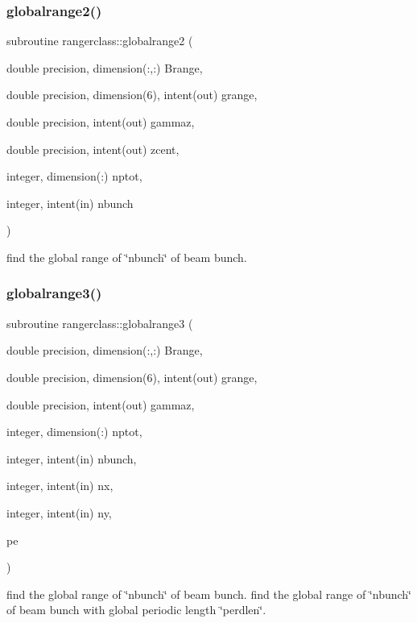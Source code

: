 \subsubsection{\texorpdfstring{globalrange2()}{globalrange2()}}
{\footnotesize\ttfamily subroutine rangerclass\+::globalrange2 (\begin{DoxyParamCaption}\item[{double precision, dimension(\+:,\+:)}]{Brange,  }\item[{double precision, dimension(6), intent(out)}]{grange,  }\item[{double precision, intent(out)}]{gammaz,  }\item[{double precision, intent(out)}]{zcent,  }\item[{integer, dimension(\+:)}]{nptot,  }\item[{integer, intent(in)}]{nbunch }\end{DoxyParamCaption})}



find the global range of \char`\"{}nbunch\char`\"{} of beam bunch. 

\mbox{\label{namespacerangerclass_ad0b08fe4b8a1e2cbd7de8106b038e262}} 
\subsubsection{\texorpdfstring{globalrange3()}{globalrange3()}}
{\footnotesize\ttfamily subroutine rangerclass\+::globalrange3 (\begin{DoxyParamCaption}\item[{double precision, dimension(\+:,\+:)}]{Brange,  }\item[{double precision, dimension(6), intent(out)}]{grange,  }\item[{double precision, intent(out)}]{gammaz,  }\item[{integer, dimension(\+:)}]{nptot,  }\item[{integer, intent(in)}]{nbunch,  }\item[{integer, intent(in)}]{nx,  }\item[{integer, intent(in)}]{ny,  }\item[{}]{pe }\end{DoxyParamCaption})}



find the global range of \char`\"{}nbunch\char`\"{} of beam bunch. find the global range of \char`\"{}nbunch\char`\"{} of beam bunch with global periodic length \char`\"{}perdlen\char`\"{}. 


